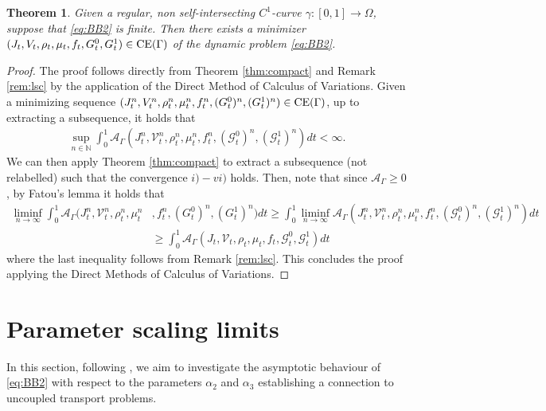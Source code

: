 \documentclass{article}
\def\calA{{\mathcal A}} \def\calB{{\mathcal B}} \def\calC{{\mathcal C}}
\newtheorem{theorem}{Theorem}[section]
\begin{document}
\begin{theorem}\label{ExistenceFixedGamma}
Given a regular, non self-intersecting $C^1$-curve $\gamma : [0,1] \rightarrow \Omega$, suppose that \eqref{eq:BB2} is finite. Then there exists a minimizer $(J_t,V_t,\rho_t,\mu_t,f_t, G_t^0,G_t^1) \in {\rm CE}(\Gamma)$ of the dynamic problem \eqref{eq:BB2}.  
\end{theorem}

\begin{proof}
    The proof follows directly from Theorem \ref{thm:compact} and Remark \ref{rem:lsc} by the application of the Direct Method of Calculus of Variations. Given a minimizing sequence $(J_t^n,V_t^n,\rho_t^n,\mu_t^n,f_t^n,(G_t^0)^n,(G_t^1)^n) \in {\rm CE}(\Gamma)$, up to extracting a subsequence, it holds that 
    \begin{align}
    \sup_{n\in \mathbb{N}} \int_0^1 \calA_\Gamma(J_t^n,\mathcal{V}_t^n,\rho_t^n,\mu_t^n,f_t^n,(\mathcal{G}_t^0)^n,(\mathcal{G}_t^1)^n)dt  < \infty.
    \end{align}
   We can then apply Theorem \ref{thm:compact} to extract a subsequence (not relabelled) such that the convergence $i) - vi)$ holds. Then, note that since $\mathcal{A}_\Gamma \geq 0$, by Fatou's lemma it holds that 
   \begin{align*}
       \liminf_{n\to\infty} \int_0^1 \calA_\Gamma(J_t^n,\mathcal{V}_t^n,\rho_t^n,\mu_t^n & ,f_t^n,(G_t^0)^n,(G_t^1)^n)dt \geq \int_0^1 \liminf_{n\to\infty} \calA_\Gamma(J_t^n,\mathcal{V}_t^n,\rho_t^n,\mu_t^n,f_t^n,(\mathcal{G}_t^0)^n,(\mathcal{G}_t^1)^n)dt \\
       & \geq \int_0^1 \calA_\Gamma(J_t,\mathcal{V}_t,\rho_t,\mu_t,f_t,\mathcal{G}_t^0,\mathcal{G}_t^1)dt
   \end{align*}
   where the last inequality follows from Remark \ref{rem:lsc}. This concludes the proof applying the Direct Methods of Calculus of Variations.
\end{proof}

\section{Parameter scaling limits}\label{ParamLim}

In this section, following \cite[Section 6]{monsaingeon2021new}, we aim to investigate the asymptotic behaviour of \eqref{eq:BB2} with respect to the parameters $\alpha_2$ and $\alpha_3$ establishing a connection to uncoupled transport problems. 
\end{document}
